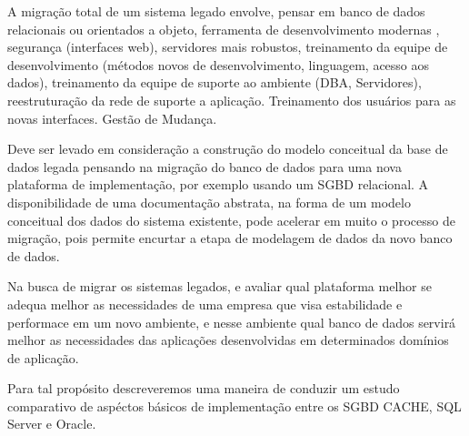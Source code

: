 A migração total de um sistema legado envolve, pensar em banco de dados relacionais ou orientados a objeto, ferramenta de desenvolvimento modernas , segurança (interfaces web), servidores mais robustos, treinamento da equipe de desenvolvimento (métodos novos de desenvolvimento, linguagem, acesso aos dados), treinamento da equipe de suporte ao ambiente (DBA, Servidores), reestruturação da rede de suporte a  aplicação. Treinamento dos usuários para as novas interfaces. Gestão de Mudança. 

Deve ser levado em consideração a construção do modelo conceitual da base de dados legada pensando na migração do banco de dados para
uma nova plataforma de implementação, por exemplo usando um SGBD relacional. A disponibilidade de uma documentação abstrata, na forma de um modelo conceitual dos dados do sistema existente, pode acelerar em muito o processo de migração, pois permite encurtar a etapa de modelagem de dados da novo banco de dados. \cite{heuser2001projeto}

Na busca de migrar os sistemas legados, e avaliar qual plataforma melhor se adequa melhor as necessidades de uma empresa que visa estabilidade e performace em um novo ambiente, e nesse ambiente qual banco de dados servirá melhor as necessidades das aplicações desenvolvidas em determinados domínios de aplicação. 

Para tal propósito descreveremos uma maneira de conduzir um estudo comparativo de aspéctos básicos de implementação entre os SGBD CACHE, SQL Server e Oracle.

